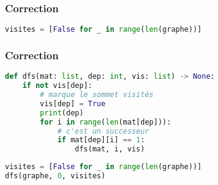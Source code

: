 \documentclass[svgnames,11pt]{beamer}
\begin{document}
\begin{frame}[fragile]
    \frametitle{Correction}

\begin{center}
\begin{lstlisting}[language=Python , basicstyle=\ttfamily\small, xleftmargin=2em, xrightmargin=2em]
visites = [False for _ in range(len(graphe))]
\end{lstlisting}
\end{center}

\end{frame}
\begin{frame}[fragile]
    \frametitle{Correction}

\begin{center}
\begin{lstlisting}[language=Python , basicstyle=\ttfamily\small, xleftmargin=0.2em, xrightmargin=0em]
def dfs(mat: list, dep: int, vis: list) -> None:
    if not vis[dep]:
        # marque le sommet visités
        vis[dep] = True
        print(dep)
        for i in range(len(mat[dep])):
            # c'est un successeur
            if mat[dep][i] == 1:
                dfs(mat, i, vis)
\end{lstlisting}

\end{center}
\begin{center}
\begin{lstlisting}[language=Python , basicstyle=\ttfamily\small, xleftmargin=0.2em, xrightmargin=0em]
visites = [False for _ in range(len(graphe))]
dfs(graphe, 0, visites)
\end{lstlisting}
\label{CODE}
\end{center}
\end{frame}
\end{document}
